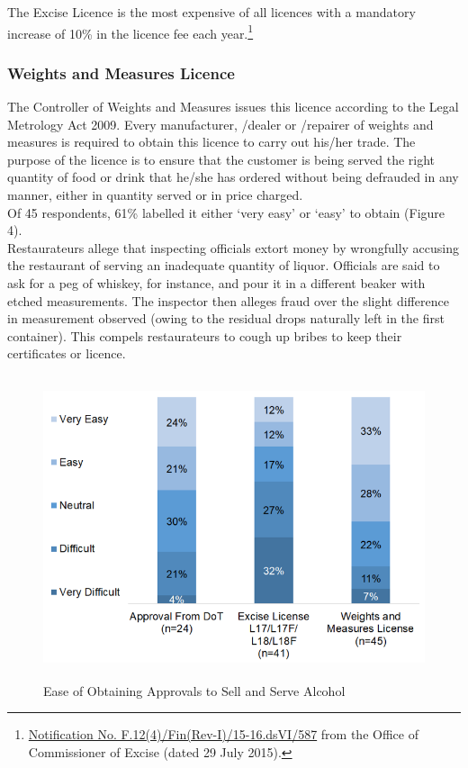 \documentclass[a4paper, 12pt]{article}
\begin{document}
		The Excise Licence is the most expensive of all licences with a mandatory increase of 10\% in the licence fee each year.\footnote{\href{https://bit.ly/2xoejoG}{Notification No. F.12(4)/Fin(Rev-I)/15-16.dsVI/587} from the Office of Commissioner of Excise 
(dated 29 July 2015).} 
		
		
		\subsubsection{Weights and Measures Licence}
		The Controller of Weights and Measures issues this licence according to the Legal Metrology Act 2009. Every manufacturer, /dealer or /repairer of weights and measures is required to obtain this licence to carry out his/her trade. The purpose of the 
licence is to ensure that the customer is being served the right quantity of food or drink that he/she has ordered without being defrauded in any manner, either in quantity served or in price charged.\\
		
		Of 45 respondents, 61\% labelled it either ‘very easy’ or ‘easy’ to obtain (Figure 4). \\%
		
		Restaurateurs allege that inspecting officials extort money by wrongfully accusing the restaurant of serving an inadequate quantity of liquor. Officials are said to ask for a peg of whiskey, for instance, and pour it in a different beaker with etched 
measurements. The inspector then alleges fraud over the slight difference in measurement observed (owing to the residual drops naturally left in the first container). This compels restaurateurs to cough up bribes to keep their certificates or licence.
		
		\begin{figure}[H]
                    	\centering
                    	\includegraphics[height = 3.5in]{Figure4.png}
                    	\caption[Optional Caption]{Ease of Obtaining Approvals to Sell and Serve Alcohol}
		\end{figure}
	
\end{document}
